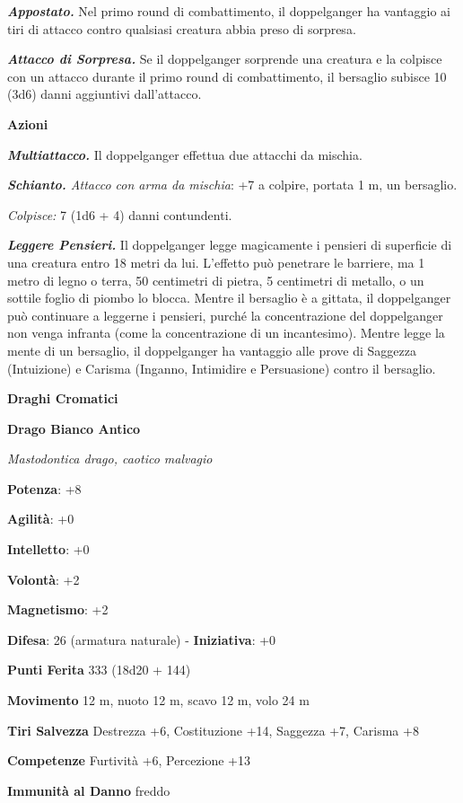 \begin{multicols}{2}
\emph{\textbf{Appostato.}} Nel primo round di combattimento, il
doppelganger ha vantaggio ai tiri di attacco contro qualsiasi creatura
abbia preso di sorpresa.

\emph{\textbf{Attacco di Sorpresa.}} Se il doppelganger sorprende una
creatura e la colpisce con un attacco durante il primo round di
combattimento, il bersaglio subisce 10 (3d6) danni aggiuntivi
dall'attacco.

\smallskip\textbf{Azioni}

\emph{\textbf{Multiattacco.}} Il doppelganger effettua due attacchi da
mischia.

\emph{\textbf{Schianto.} Attacco con arma da mischia}: +7 a colpire,
portata 1 m, un bersaglio.

\emph{Colpisce:} 7 (1d6 + 4) danni contundenti.

\emph{\textbf{Leggere Pensieri.}} Il doppelganger legge magicamente i
pensieri di superficie di una creatura entro 18 metri da lui. L'effetto
può penetrare le barriere, ma 1 metro di legno o terra, 50 centimetri di
pietra, 5 centimetri di metallo, o un sottile foglio di piombo lo
blocca. Mentre il bersaglio è a gittata, il doppelganger può continuare
a leggerne i pensieri, purché la concentrazione del doppelganger non
venga infranta (come la concentrazione di un incantesimo). Mentre legge
la mente di un bersaglio, il doppelganger ha vantaggio alle prove di
Saggezza (Intuizione) e Carisma (Inganno, Intimidire e Persuasione)
contro il bersaglio.

\textbf{Draghi Cromatici}

\textbf{Drago Bianco Antico}

\emph{Mastodontica drago, caotico malvagio}

\textbf{Potenza}: +8

\textbf{Agilità}: +0

\textbf{Intelletto}: +0

\textbf{Volontà}: +2

\textbf{Magnetismo}: +2

\textbf{Difesa}: 26 (armatura naturale) - \textbf{Iniziativa}: +0

\textbf{Punti Ferita} 333 (18d20 + 144)

\textbf{Movimento} 12 m, nuoto 12 m, scavo 12 m, volo 24 m

\textbf{Tiri Salvezza} Destrezza +6, Costituzione +14, Saggezza +7,
Carisma +8

\textbf{Competenze} Furtività +6, Percezione +13

\textbf{Immunità al Danno} freddo


\end{multicols}
